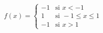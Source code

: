 \item $f(x) = \begin{cases} -1 & \text{si } x < -1 \\ 1 & \text{si } -1 \le x \le 1 \\ -1 & \text{si } x > 1 \end{cases}$
